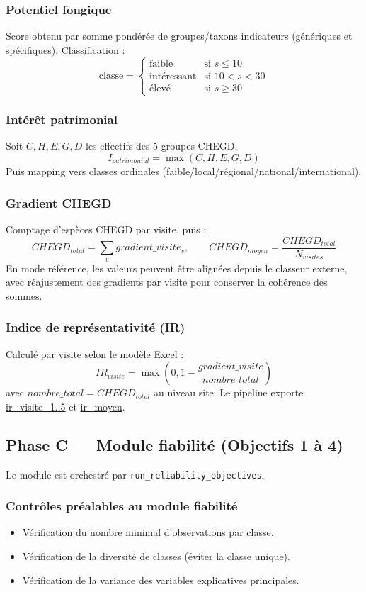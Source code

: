 \documentclass[11pt,a4paper]{article}
\begin{document}
\subsubsection{Potentiel fongique}
Score obtenu par somme pondérée de groupes/taxons indicateurs (génériques et spécifiques).
Classification :
\[
\text{classe}=
\begin{cases}
\text{faible} & \text{si } s\le 10\\
\text{intéressant} & \text{si } 10<s<30\\
\text{élevé} & \text{si } s\ge 30
\end{cases}
\]

\subsubsection{Intérêt patrimonial}
Soit $C,H,E,G,D$ les effectifs des 5 groupes CHEGD.
\[
I_{patrimonial}=\max(C,H,E,G,D)
\]
Puis mapping vers classes ordinales (faible/local/régional/national/international).

\subsubsection{Gradient CHEGD}
Comptage d'espèces CHEGD par visite, puis :
\[
CHEGD_{total}=\sum_{v} gradient\_visite_v,
\qquad
CHEGD_{moyen}=\frac{CHEGD_{total}}{N_{visites}}
\]
En mode référence, les valeurs peuvent être alignées depuis le classeur externe,
avec réajustement des gradients par visite pour conserver la cohérence des sommes.

\subsubsection{Indice de représentativité (IR)}
Calculé par visite selon le modèle Excel :
\[
IR_{visite}=\max\left(0,1-\frac{gradient\_visite}{nombre\_total}\right)
\]
avec \(nombre\_total = CHEGD_{total}\) au niveau site.
Le pipeline exporte \url{ir_visite_1..5} et \url{ir_moyen}.

\subsection{Phase C --- Module fiabilité (Objectifs 1 à 4)}
Le module est orchestré par \texttt{run\_reliability\_objectives}.

\subsubsection{Contrôles préalables au module fiabilité}
\begin{itemize}[leftmargin=1.2cm]
  \item Vérification du nombre minimal d'observations par classe.
  \item Vérification de la diversité de classes (éviter la classe unique).
  \item Vérification de la variance des variables explicatives principales.
\end{itemize}
\end{document}
